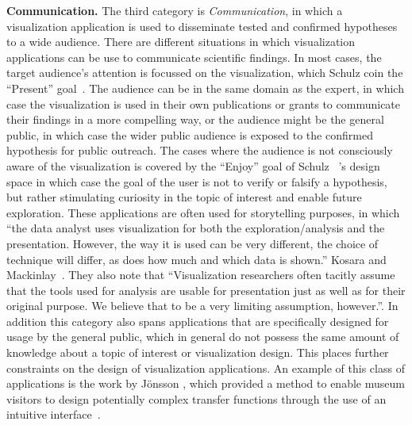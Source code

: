 \textbf{Communication. }  The third category is \emph{Communication}, in which a visualization application is used to disseminate tested and confirmed hypotheses to a wide audience.  There are different situations in which visualization applications can be use to communicate scientific findings.  In most cases, the target audience's attention is focussed on the visualization, which Schulz \etal coin the ``Present'' goal~\cite{schulz2013design}.  The audience can be in the same domain as the expert, in which case the visualization is used in their own publications or grants to communicate their findings in a more compelling way, or the audience might be the general public, in which case the wider public audience is exposed to the confirmed hypothesis for public outreach.  The cases where the audience is not consciously aware of the visualization is covered by the ``Enjoy'' goal of Schulz \etal\ 's design space in which case the goal of the user is not to verify or falsify a hypothesis, but rather stimulating curiosity in the topic of interest and enable future exploration.  These applications are often used for storytelling purposes, in which ``the data analyst uses visualization for both the exploration/analysis and the presentation. However, the way it is used can be very different, the choice of technique will differ, as does how much and which data is shown.'' Kosara and Mackinlay~\cite{kosara2013storytelling}.  They also note that ``Visualization researchers often tacitly assume that the tools used for analysis are usable for presentation just as well as for their original purpose. We believe that to be a very limiting assumption, however.''.  In addition this category also spans applications that are specifically designed for usage by the general public, which in general do not possess the same amount of knowledge about a topic of interest or visualization design.  This places further constraints on the design of visualization applications.  An example of this class of applications is the work by J\"onsson \etal , which provided a method to enable museum visitors to design potentially complex transfer functions through the use of an intuitive interface~\cite{jonsson2016intuitive}.

